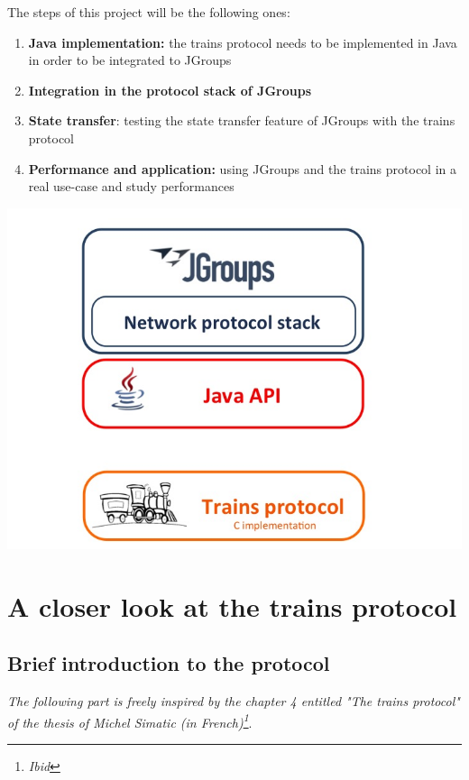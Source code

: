 \documentclass[a4paper,10pt]{report}
\begin{document}
The steps of this project will be the following ones: 

\begin{enumerate}
  \item \textbf{Java implementation:} the trains protocol needs to be implemented in Java in order to be integrated to JGroups
  \item \textbf{Integration in the protocol stack of JGroups}
  \item \textbf{State transfer}: testing the state transfer feature of JGroups with the trains protocol
  \item \textbf{Performance and application:} using JGroups and the trains protocol in a real use-case and study performances
\end{enumerate}

\begin{center}
\includegraphics[scale=0.4]{img/stack.jpg}
\end{center}

\section{A closer look at the trains protocol}

\subsection{Brief introduction to the protocol}

\textit{The following part is freely inspired by the chapter 4 entitled "The trains protocol" of the thesis of Michel Simatic (in French)\footnote{\textit{Ibid}}}.\\
\end{document}
